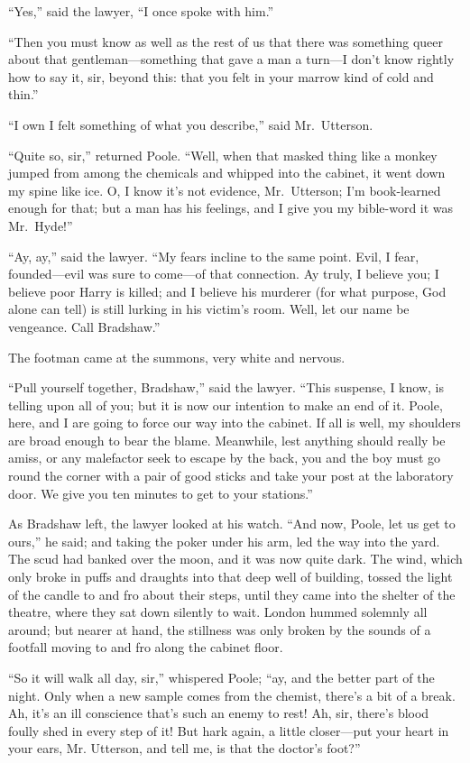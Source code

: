 \documentclass[12pt,openright]{book}
\begin{document}
“Yes,” said the lawyer, “I once spoke with him.”

“Then you must know as well as the rest of us that there was something queer about that gentleman—something that gave a man a turn—I don’t know rightly how to say it, sir, beyond this: that you felt in your marrow kind of cold and thin.”

“I own I felt something of what you describe,” said Mr. Utterson.

“Quite so, sir,” returned Poole. “Well, when that masked thing like a monkey jumped from among the chemicals and whipped into the cabinet, it went down my spine like ice. O, I know it’s not evidence, Mr. Utterson; I’m book-learned enough for that; but a man has his feelings, and I give you my bible-word it was Mr. Hyde!”

“Ay, ay,” said the lawyer. “My fears incline to the same point. Evil, I fear, founded—evil was sure to come—of that connection. Ay truly, I believe you; I believe poor Harry is killed; and I believe his murderer (for what purpose, God alone can tell) is still lurking in his victim’s room. Well, let our name be vengeance. Call Bradshaw.”

The footman came at the summons, very white and nervous.

“Pull yourself together, Bradshaw,” said the lawyer. “This suspense, I know, is telling upon all of you; but it is now our intention to make an end of it. Poole, here, and I are going to force our way into the cabinet. If all is well, my shoulders are broad enough to bear the blame. Meanwhile, lest anything should really be amiss, or any malefactor seek to escape by the back, you and the boy must go round the corner with a pair of good sticks and take your post at the laboratory door. We give you ten minutes to get to your stations.”

As Bradshaw left, the lawyer looked at his watch. “And now, Poole, let us get to ours,” he said; and taking the poker under his arm, led the way into the yard. The scud had banked over the moon, and it was now quite dark. The wind, which only broke in puffs and draughts into that deep well of building, tossed the light of the candle to and fro about their steps, until they came into the shelter of the theatre, where they sat down silently to wait. London hummed solemnly all around; but nearer at hand, the stillness was only broken by the sounds of a footfall moving to and fro along the cabinet floor.

“So it will walk all day, sir,” whispered Poole; “ay, and the better part of the night. Only when a new sample comes from the chemist, there’s a bit of a break. Ah, it’s an ill conscience that’s such an enemy to rest! Ah, sir, there’s blood foully shed in every step of it! But hark again, a little closer—put your heart in your ears, Mr. Utterson, and tell me, is that the doctor’s foot?”
\end{document}
